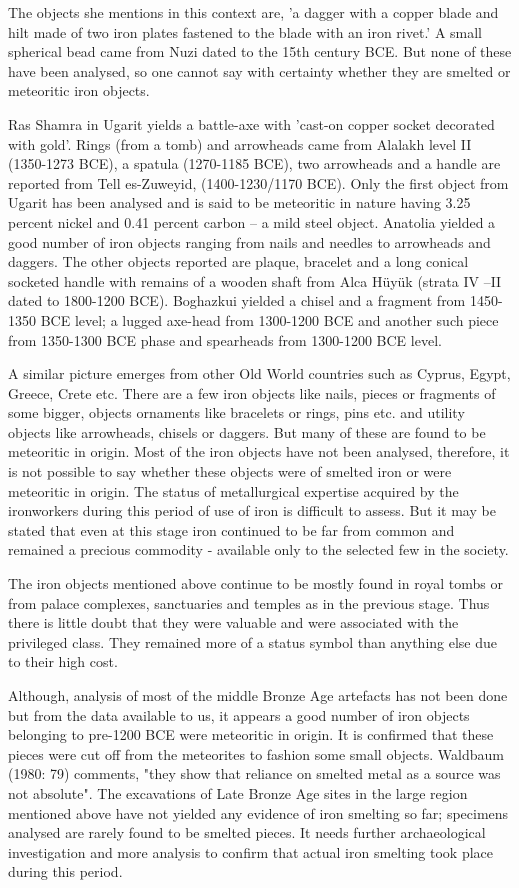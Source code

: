 The objects she mentions in this context are, 'a dagger with a copper blade and hilt made of two iron plates fastened to the blade with an iron rivet.' A small spherical bead came from Nuzi dated to the 15th century BCE. But none of these have been analysed, so one cannot say with certainty whether they are smelted or meteoritic iron objects.

Ras Shamra in Ugarit yields a battle-axe with 'cast-on copper socket decorated with gold'. Rings (from a tomb) and arrowheads came from Alalakh level II (1350-1273 BCE), a spatula (1270-1185 BCE), two arrowheads and a handle are reported from Tell es-Zuweyid, (1400-1230/1170 BCE). Only the first object from Ugarit has been analysed and is said to be meteoritic in nature having 3.25 percent nickel and 0.41 percent carbon – a mild steel object. Anatolia yielded a good number of iron objects ranging from nails and needles to arrowheads and daggers. The other objects reported are plaque, bracelet and a long conical socketed handle with remains of a wooden shaft from Alca Hüyük (strata IV –II dated to 1800-1200 BCE). Boghazkui yielded a chisel and a fragment from 1450-1350 BCE level; a lugged axe-head from 1300-1200 BCE and another such piece from 1350-1300 BCE phase and spearheads from 1300-1200 BCE level.

A similar picture emerges from other Old World countries such as Cyprus, Egypt, Greece, Crete etc. There are a few iron objects like nails, pieces or fragments of some bigger, objects ornaments like bracelets or rings, pins etc. and utility objects like arrowheads, chisels or daggers. But many of these are found to be meteoritic in origin. Most of the iron objects have not been analysed, therefore, it is not possible to say whether these objects were of smelted iron or were meteoritic in origin. The status of metallurgical expertise acquired by the ironworkers during this period of use of iron is difficult to assess. But it may be stated that even at this stage iron continued to be far from common and remained a precious commodity - available only to the selected few in the society.

The iron objects mentioned above continue to be mostly found in royal tombs or from palace complexes, sanctuaries and temples as in the previous stage. Thus there is little doubt that they were valuable and were associated with the privileged class. They remained more of a status symbol than anything else due to their high cost.

Although, analysis of most of the middle Bronze Age artefacts has not been done but from the data available to us, it appears a good number of iron objects belonging to pre-1200 BCE were meteoritic in origin. It is confirmed that these pieces were cut off from the meteorites to fashion some small objects. Waldbaum (1980: 79) comments, "they show that reliance on smelted metal as a source was not absolute". The excavations of Late Bronze Age sites in the large region mentioned above have not yielded any evidence of iron smelting so far; specimens analysed are rarely found to be smelted pieces. It needs further archaeological investigation and more analysis to confirm that actual iron smelting took place during this period.

